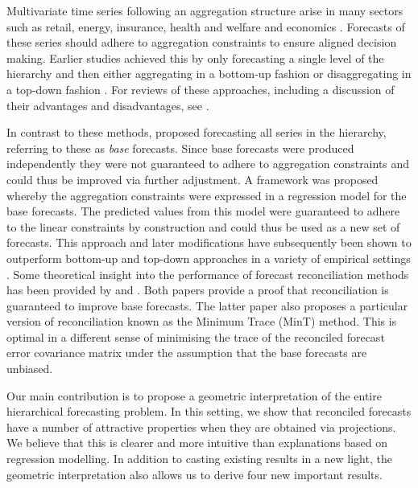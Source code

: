 \documentclass[12pt]{article}
\theoremstyle{definition}
\begin{document}
Multivariate time series following an aggregation structure arise in many sectors such as retail, energy, insurance, health and welfare and economics \citep[see for example][]{KarMal2019, Taieb2017, NysEtAl2019, AlmVan2016, JeoEtAl2019, Mahkya2017, LiTan2019, Shang2017, AthEtAl2019_MacroBook}. Forecasts of these series should adhere to aggregation constraints to ensure aligned decision making. Earlier studies achieved this by only forecasting a single level of the hierarchy and then either aggregating in a bottom-up fashion \citep{Dunn1976} or disaggregating in a top-down fashion \citep{Gross1990, Athanasopoulos2009}. For reviews of these approaches, including a discussion of their advantages and disadvantages, see \citet{Schwarzkopf1988, Kahn1998, Lapide1998, Fliedner2001}.

In contrast to these methods, \citet{Hyndman2011} proposed forecasting all series in the hierarchy, referring to these as \emph{base} forecasts. Since base forecasts were produced independently they were not guaranteed to adhere to aggregation constraints and could thus be improved via further adjustment. A framework was proposed whereby the aggregation constraints were expressed in a regression model for the base forecasts. The predicted values from this model were guaranteed to adhere to the linear constraints by construction and could thus be used as a new set of forecasts. This approach and later modifications have subsequently been shown to outperform bottom-up and top-down approaches in a variety of empirical settings \citep[see for example][among others]{Athanasopoulos2009, AthEtAl2017, WicEtAl2019}. Some theoretical insight into the performance of forecast reconciliation methods has been provided by \citet{VanErven2015a} and \citet{WicEtAl2019}. Both papers provide a proof that reconciliation is guaranteed to improve base forecasts. The latter paper also proposes a particular version of reconciliation known as the Minimum Trace (MinT) method. This is optimal in a {\color{blue} different} sense of minimising the trace of the reconciled forecast error covariance matrix under the assumption that the base forecasts are unbiased.

Our main contribution is to propose a geometric interpretation of the entire hierarchical forecasting problem. In this setting, we show that reconciled forecasts have a number of attractive properties when they are obtained via projections. We believe that this is clearer and more intuitive than explanations based on regression modelling. In addition to casting existing results in a new light, the geometric interpretation also allows us to derive {\color{blue}four} new important results.
\end{document}

